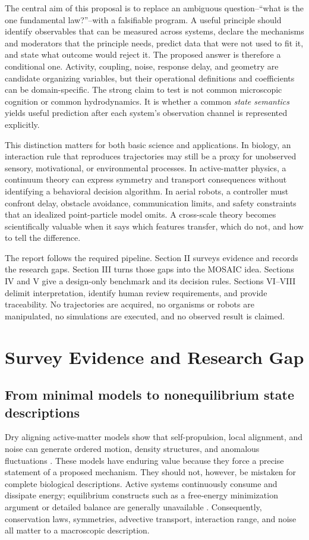 \documentclass[conference]{../../../../Conference-LaTeX-template_10-17-19/IEEEtran}
\begin{document}
The central aim of this proposal is to replace an ambiguous question--``what is the one fundamental law?''--with a falsifiable program. A useful principle should identify observables that can be measured across systems, declare the mechanisms and moderators that the principle needs, predict data that were not used to fit it, and state what outcome would reject it. The proposed answer is therefore a conditional one. Activity, coupling, noise, response delay, and geometry are candidate organizing variables, but their operational definitions and coefficients can be domain-specific. The strong claim to test is not common microscopic cognition or common hydrodynamics. It is whether a common \emph{state semantics} yields useful prediction after each system's observation channel is represented explicitly.

This distinction matters for both basic science and applications. In biology, an interaction rule that reproduces trajectories may still be a proxy for unobserved sensory, motivational, or environmental processes. In active-matter physics, a continuum theory can express symmetry and transport consequences without identifying a behavioral decision algorithm. In aerial robots, a controller must confront delay, obstacle avoidance, communication limits, and safety constraints that an idealized point-particle model omits. A cross-scale theory becomes scientifically valuable when it says which features transfer, which do not, and how to tell the difference.

The report follows the required pipeline. Section II surveys evidence and records the research gaps. Section III turns those gaps into the MOSAIC idea. Sections IV and V give a design-only benchmark and its decision rules. Sections VI--VIII delimit interpretation, identify human review requirements, and provide traceability. No trajectories are acquired, no organisms or robots are manipulated, no simulations are executed, and no observed result is claimed.

\section{Survey Evidence and Research Gap}
\subsection{From minimal models to nonequilibrium state descriptions}
Dry aligning active-matter models show that self-propulsion, local alignment, and noise can generate ordered motion, density structures, and anomalous fluctuations \cite{chate,ginelli}. These models have enduring value because they force a precise statement of a proposed mechanism. They should not, however, be mistaken for complete biological descriptions. Active systems continuously consume and dissipate energy; equilibrium constructs such as a free-energy minimization argument or detailed balance are generally unavailable \cite{ramaswamy,gompper}. Consequently, conservation laws, symmetries, advective transport, interaction range, and noise all matter to a macroscopic description.
\end{document}
